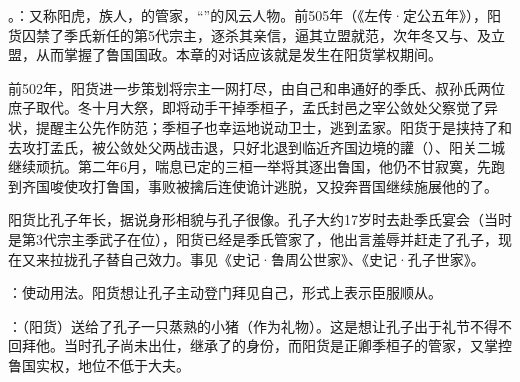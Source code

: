 {
\item {}。：又称阳虎，族人，的管家，“”的风云人物。前505年（《左传·定公五年》），阳货囚禁了季氏新任的第5代宗主，逐杀其亲信，逼其立盟就范，次年冬又与、及立盟，从而掌握了鲁国国政。本章的对话应该就是发生在阳货掌权期间。

前502年，阳货进一步策划将宗主一网打尽，由自己和串通好的季氏、叔孙氏两位庶子取代。冬十月大祭，即将动手干掉季桓子，孟氏封邑之宰公敛处父察觉了异状，提醒主公先作防范；季桓子也幸运地说动卫士，逃到孟家。阳货于是挟持了和去攻打孟氏，被公敛处父两战击退，只好北退到临近齐国边境的讙（）、阳关二城继续顽抗。第二年6月，喘息已定的三桓一举将其逐出鲁国，他仍不甘寂寞，先跑到齐国唆使攻打鲁国，事败被擒后连使诡计逃脱，又投奔晋国继续施展他的了。

阳货比孔子年长，据说身形相貌与孔子很像。孔子大约17岁时去赴季氏宴会（当时是第3代宗主季武子在位），阳货已经是季氏管家了，他出言羞辱并赶走了孔子，现在又来拉拢孔子替自己效力。事见《史记·鲁周公世家》、《史记·孔子世家》。

：使动用法。阳货想让孔子主动登门拜见自己，形式上表示臣服顺从。

\item {}：（阳货）送给了孔子一只蒸熟的小猪（作为礼物）。这是想让孔子出于礼节不得不回拜他。当时孔子尚未出仕，继承了的身份，而阳货是正卿季桓子的管家，又掌控鲁国实权，地位不低于大夫。

}
